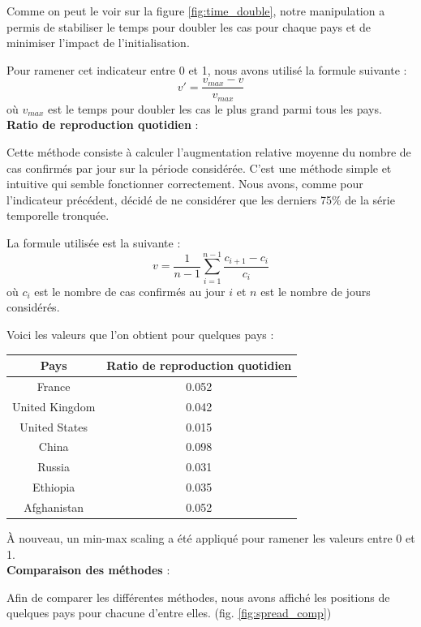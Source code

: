 \documentclass[12pt]{iEEEtran}
\begin{document}
Comme on peut le voir sur la figure \ref{fig:time_double}, notre manipulation a permis de stabiliser
le temps pour doubler les cas pour chaque pays et de minimiser l'impact de l'initialisation.

Pour ramener cet indicateur entre 0 et 1, nous avons utilisé la formule suivante :
$$v' = \frac{v_{max}-v}{v_{max}}$$ où $v_{max}$ est le temps pour doubler les cas le plus grand parmi
tous les pays.
\\

\noindent\textbf{Ratio de reproduction quotidien} :

Cette méthode consiste à calculer l'augmentation relative moyenne du nombre de cas confirmés par jour
sur la période considérée. C'est une méthode simple et intuitive qui semble fonctionner correctement.
Nous avons, comme pour l'indicateur précédent, décidé de ne considérer que les derniers 75\% de la série
temporelle tronquée.

La formule utilisée est la suivante :
$$v = \frac{1}{n-1} \sum_{i=1}^{n-1} \frac{c_{i+1} - c_i}{c_i}$$ où $c_i$ est le nombre de cas confirmés
au jour $i$ et $n$ est le nombre de jours considérés.

Voici les valeurs que l'on obtient pour quelques pays :
\begin{table}[h]
    \centering
    \begin{tabular}{|c|c|}
        \hline
        Pays & Ratio de reproduction quotidien \\
        \hline
        France & 0.052 \\
        United Kingdom & 0.042 \\
        United States & 0.015 \\
        China & 0.098 \\
        Russia & 0.031 \\
        Ethiopia & 0.035 \\
        Afghanistan & 0.052 \\
        \hline
    \end{tabular}
\end{table}

À nouveau, un min-max scaling a été appliqué pour ramener les valeurs entre 0 et 1.
\\

\noindent\textbf{Comparaison des méthodes} :

Afin de comparer les différentes méthodes, nous avons affiché les positions de quelques
pays pour chacune d'entre elles. (fig. \ref{fig:spread_comp})
\end{document}
